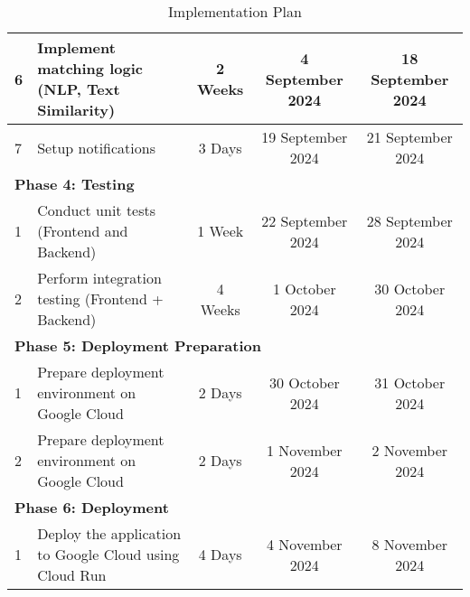 \begin{table}[h!]
\begin{tabular}{|l|p{5cm}|c|c|c|}
6 & Implement matching logic (NLP, Text Similarity) & 2 Weeks & 4 September 2024 & 18 September 2024 \\ \hline
7 & Setup notifications & 3 Days & 19 September 2024 & 21 September 2024 \\ \hline
\multicolumn{5}{|l|}{\textbf{Phase 4: Testing}} \\
\hline
1 & Conduct unit tests (Frontend and Backend) & 1 Week & 22 September 2024 & 28 September 2024 \\
\hline
2 & Perform integration testing (Frontend + Backend) & 4 Weeks & 1 October 2024 & 30 October 2024 \\
\hline
\multicolumn{5}{|l|}{\textbf{Phase 5: Deployment Preparation}} \\
\hline
1 & Prepare deployment environment on Google Cloud & 2 Days & 30 October 2024 & 31 October 2024 \\
\hline
2 & Prepare deployment environment on Google Cloud & 2 Days & 1 November 2024 & 2 November 2024 \\
\hline
\multicolumn{5}{|l|}{\textbf{Phase 6: Deployment}} \\
\hline
1 & Deploy the application to Google Cloud using Cloud Run & 4 Days & 4 November 2024 & 8 November 2024 \\
\hline
\end{tabular}
\caption{Implementation Plan}
\end{table}

